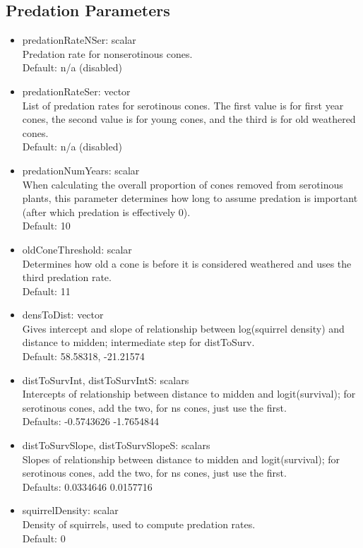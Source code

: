 \documentclass[12pt, english]{article}
\begin{document}
\subsection{Predation Parameters}
\begin{itemize}
	\item{predationRateNSer: scalar\\Predation rate for nonserotinous cones.\\Default: n/a (disabled)}
	\item{predationRateSer: vector\\List of predation rates for serotinous cones. The first value is for first year cones, the second value is for young cones, and the third is for old weathered cones.\\Default: n/a (disabled)}
	\item{predationNumYears: scalar\\When calculating the overall proportion of cones removed from serotinous plants, this parameter determines how long to assume predation is important (after which predation is effectively 0).\\Default: 10}
	\item{oldConeThreshold: scalar\\Determines how old a cone is before it is considered weathered and uses the third predation rate.\\Default: 11}
	\item{densToDist: vector\\Gives intercept and slope of relationship between log(squirrel density) and distance to midden; intermediate step for distToSurv.\\Default: 58.58318, -21.21574 }
	\item{distToSurvInt, distToSurvIntS: scalars\\Intercepts of relationship between distance to midden and logit(survival); for serotinous cones, add the two, for ns cones, just use the first.\\Defaults: -0.5743626 -1.7654844}
	\item{distToSurvSlope, distToSurvSlopeS: scalars\\Slopes of relationship between distance to midden and logit(survival); for serotinous cones, add the two, for ns cones, just use the first.\\Defaults: 0.0334646 0.0157716}
	\item{squirrelDensity: scalar\\Density of squirrels, used to compute predation rates.\\Default: 0}
	
\end{itemize}
\end{document}
